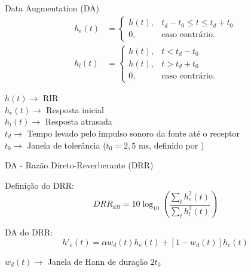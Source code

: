 \begin{frame}{Data Augmentation (DA)}
    \begin{align*} 
        h_e(t) &= 
        \begin{cases} 
            h(t), & t_d-t_0 \le t \le t_d+t_0 \\
            0, & \text{caso contrário.}
        \end{cases} \\
        h_l(t) &= 
        \begin{cases} 
            h(t), & t < t_d - t_0 \\
            h(t), & t > t_d + t_0 \\
            0, & \text{caso contrário.}
        \end{cases}
    \end{align*}
    \vspace{0.5cm}

    $h(t) \rightarrow$ RIR \\
    $h_e(t) \rightarrow$ Resposta inicial \\ 
    $h_l(t) \rightarrow$ Resposta atrasada \\
    $t_d \rightarrow$ Tempo levado pelo impulso sonoro da fonte até o receptor \\
    $t_0 \rightarrow$ Janela de tolerância ($t_0 = 2,5$ ms, definido por \cite{RIR_Data_Aug})

\end{frame}

\begin{frame}{DA - Razão Direto-Reverberante (DRR)}

    Definição do DRR:
    \begin{equation*} 
        DRR_{dB} = 10 \log_{10} \left( \frac{\sum_t h^2_e(t)}{\sum_t h^2_l(t)} \right)
    \end{equation*}
    \vspace{0.5cm}

    DA do DRR:
    \begin{equation*} 
        h'_e(t) = \alpha w_d(t) h_e(t) + [1 - w_d(t)]h_e(t)
    \end{equation*}
    \vspace{0.5cm}

    $w_d(t) \rightarrow$ Janela de Hann de duração $2t_0$
\end{frame}

